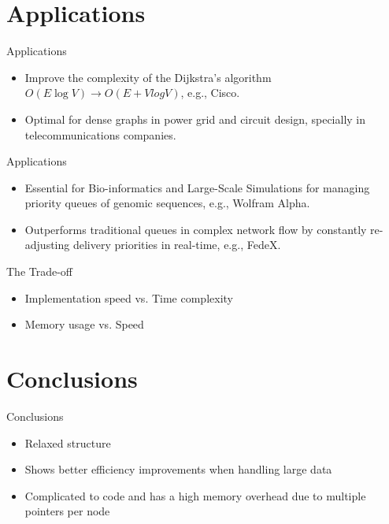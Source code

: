 \documentclass{beamer}
\begin{document}
\section{Applications}
\begin{frame}{Applications}
\begin{itemize}
    \item Improve the complexity of the Dijkstra's algorithm \(O(E\log V)\rightarrow O(E + VlogV)\), e.g., Cisco.
    \item Optimal for dense graphs in power grid and circuit design, specially in telecommunications companies.
\end{itemize}
\end{frame}


\begin{frame}{Applications}
\begin{itemize}
    \item Essential for Bio-informatics and Large-Scale Simulations for managing priority queues of genomic sequences, e.g., Wolfram Alpha.
    \item Outperforms traditional queues in complex network flow by constantly re-adjusting delivery priorities in real-time, e.g., FedeX.
\end{itemize}
\end{frame}

\begin{frame}{The Trade-off}
\begin{itemize}
    \item Implementation speed vs. Time complexity
    \item Memory usage vs. Speed
\end{itemize}
\end{frame}

\section{Conclusions}
\begin{frame}{Conclusions}
\begin{itemize}
    \item Relaxed structure
    \item Shows better efficiency improvements when handling large data
    \item Complicated to code and has a high memory overhead due to multiple pointers per node
\end{itemize}
\end{frame}
\end{document}
